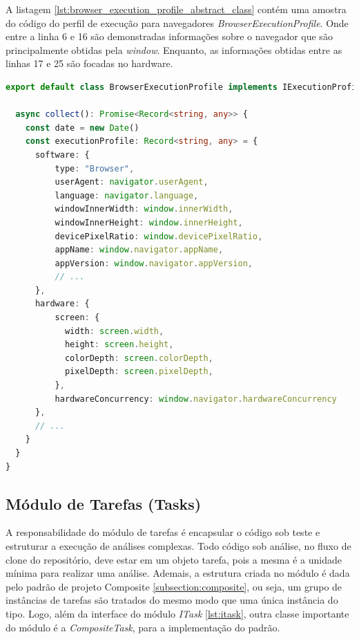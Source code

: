 \documentclass[12pt]{tcc}
\begin{document}
	A listagem \ref{lst:browser_execution_profile_abstract_class} contém uma amostra do código do perfil de execução para navegadores \emph{BrowserExecutionProfile}.
	Onde entre a linha 6 e 16 são demonstradas informações sobre o navegador que são principalmente obtidas pela  \emph{window}.
	Enquanto, as informações obtidas entre as linhas 17 e 25 são focadas no hardware.

\begin{minipage}{\linewidth}
\begin{lstlisting}[label={lst:browser_execution_profile_abstract_class}, caption={Fragmento de código da classe \emph{BrowserExecutionProfile} responsável por gerar um perfil de execução em navegadores.}, language=TypeScript, breaklines=true]
export default class BrowserExecutionProfile implements IExecutionProfile {

  async collect(): Promise<Record<string, any>> {
    const date = new Date()
    const executionProfile: Record<string, any> = {
      software: {
          type: "Browser",
          userAgent: navigator.userAgent,
          language: navigator.language,
          windowInnerWidth: window.innerWidth,
          windowInnerHeight: window.innerHeight,
          devicePixelRatio: window.devicePixelRatio,
          appName: window.navigator.appName,
          appVersion: window.navigator.appVersion,
          // ...
      },
      hardware: {
          screen: {
            width: screen.width,
            height: screen.height,
            colorDepth: screen.colorDepth,
            pixelDepth: screen.pixelDepth,
          },
          hardwareConcurrency: window.navigator.hardwareConcurrency
      },
      // ...
    }
  }
}
\end{lstlisting}
\end{minipage}


	\subsection{Módulo de Tarefas (Tasks)}
	\label{subsection:modulo-tasks}

	A responsabilidade do módulo de tarefas é encapsular o código sob teste e estruturar a execução de análises complexas.
	Todo código sob análise, no fluxo de clone do repositório, deve estar em um objeto tarefa, pois a mesma é a unidade mínima para realizar uma análise.
	Ademais, a estrutura criada no módulo é dada pelo padrão de projeto Composite \ref{subsection:composite}, ou seja, um grupo de instâncias de tarefas são tratados do mesmo modo que uma única instância do tipo.
	Logo, além da interface do módulo \emph{ITask} \ref{lst:itask}, outra classe importante do módulo é a \emph{CompositeTask}, para a implementação do padrão.
\end{document}
